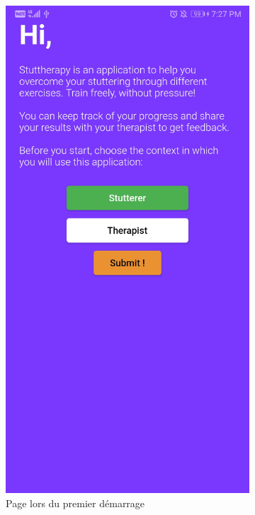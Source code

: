 \begin{appendices}
\begin{landscape}
\begin{figure}[h]
  \centering
  \begin{subfigure}{.25\textwidth}
    \centering
    \includegraphics[width=.75\linewidth]{content/imgs/screen1.jpg}
    \caption{Page lors du premier démarrage}
    \label{appendix:screen_start}
  \end{subfigure}%
  \begin{subfigure}{.25\textwidth}
    \centering

\end{subfigure}
\end{figure}
\end{landscape}
\end{appendices}
